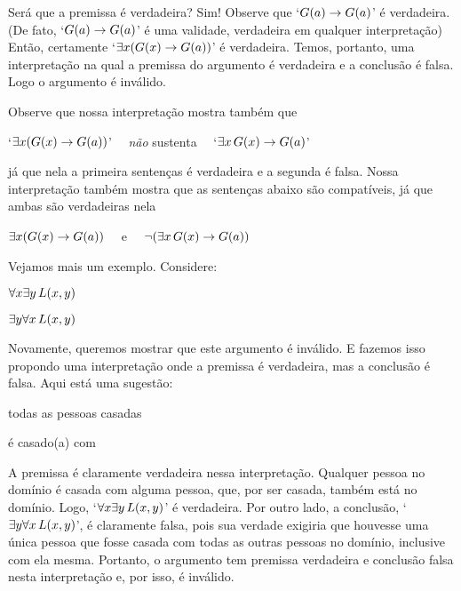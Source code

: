 Será que a premissa é verdadeira?
Sim!
Observe que `$\mathord{G}(a) \rightarrow \mathord{G}(a)$' é verdadeira. (De fato, `$\mathord{G}(a) \rightarrow \mathord{G}(a)$' é uma validade, verdadeira em qualquer interpretação)
Então, certamente `$\exists x (\mathord{G}(x) \rightarrow \mathord{G}(a))$' é verdadeira.
Temos, portanto, uma interpretação na qual a premissa do argumento é verdadeira e a conclusão é falsa.
Logo o argumento é inválido. 

Observe que nossa interpretação mostra também que
\begin{center}
	`$\exists x(\mathord{G}(x) \rightarrow \mathord{G}(a))$' \ \ \emph{não} sustenta \ \ `$\exists x\, \mathord{G}(x) \rightarrow \mathord{G}(a)$'
\end{center}
já que nela a primeira sentenças é verdadeira e a segunda é falsa.
Nossa interpretação também mostra que as sentenças abaixo são compatíveis, já que ambas são verdadeiras nela
\begin{center}
	$\exists x (\mathord{G}(x) \rightarrow \mathord{G}(a))$ \ \ e \ \ $\neg (\exists x\, \mathord{G}(x) \rightarrow \mathord{G}(a))$
\end{center}

Vejamos mais um exemplo.
Considere:
\begin{earg}
	\item[] $\forall x \exists y\, \mathord{L}(x,y)$
	\item[\therefore ] $\exists y \forall x\, \mathord{L}(x,y)$
\end{earg}

Novamente, queremos mostrar que este argumento é inválido.
E fazemos isso propondo uma interpretação onde a premissa é verdadeira, mas a conclusão é falsa.
Aqui está uma sugestão:
	\begin{center}
	\begin{ekey}
		\item[\text{domínio}] todas as pessoas casadas
		\item[\atom{L}{x,y}]  é casado(a) com 
	\end{ekey}
	\end{center}
A premissa é claramente verdadeira nessa interpretação. Qualquer pessoa no domínio é casada com alguma pessoa, que, por ser casada, também está no domínio.
Logo, `$\forall x \exists y\, \mathord{L}(x,y)$' é verdadeira.
Por outro lado, a conclusão, `$\exists y \forall x\, \mathord{L}(x,y)$',  é claramente falsa, pois sua verdade exigiria que houvesse uma única pessoa que fosse casada com todas as outras pessoas no domínio, inclusive com ela mesma.
Portanto, o argumento tem premissa verdadeira e conclusão falsa nesta interpretação e, por isso, é inválido.

